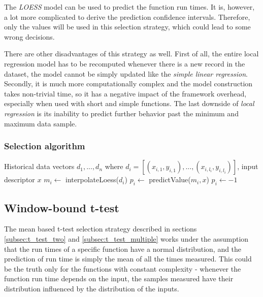 The \textit{LOESS} model can be used to predict the function run times. It is, however, a lot more complicated to derive the prediction confidence intervals. Therefore, only the values will be used in this selection strategy, which could lead to some wrong decisions.

There are other disadvantages of this strategy as well. First of all, the entire local regression model has to be recomputed whenever there is a new record in the dataset, the model cannot be simply updated like the \textit{simple linear regression}. Secondly, it is much more computationally complex and the model construction takes non-trivial time, so it has a negative impact of the framework overhead, especially when used with short and simple functions. The last downside of \textit{local regression} is its inability to predict further behavior past the minimum and maximum data sample.

\subsubsection{Selection algorithm}

\begin{algorithmic}[1] %
	\INPUT Historical data vectors $d_1,...,d_n$ where $d_i = [(x_{i,1}, y_{i,1}),...,(x_{i,l_i}, y_{i,l_i})]$, input descriptor $x$
	\State $m_i \gets$ interpolateLoess($d_i$)
	\State $p_i \gets$ predictValue($m_i, x$)
	\State$p_i \gets -1$
	\EndIf
	\EndFor
	\State{}
\end{algorithmic}

\subsection{Window-bound t-test}
\label{subsec:window_bound_t_test}

The mean based t-test selection strategy described in sections \ref{subsec:t_test_two} and \ref{subsec:t_test_multiple} works under the assumption that the run times of a specific function have a normal distribution, and the prediction of run time is simply the mean of all the times measured. This could be the truth only for the functions with constant complexity - whenever the function run time depends on the input, the samples measured have their distribution influenced by the distribution of the inputs.

